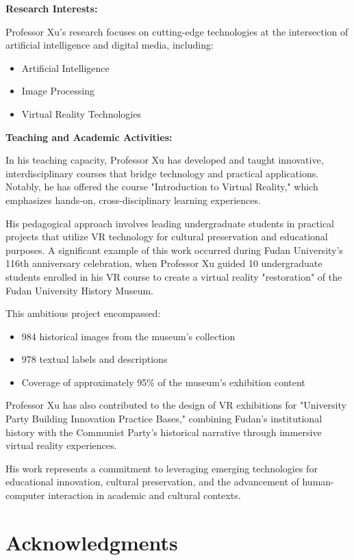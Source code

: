 \documentclass[11pt,letterpaper]{book}
\begin{document}
\textbf{Research Interests:}

Professor Xu's research focuses on cutting-edge technologies at the intersection of artificial intelligence and digital media, including:
\begin{itemize}
\item Artificial Intelligence
\item Image Processing
\item Virtual Reality Technologies
\end{itemize}

\textbf{Teaching and Academic Activities:}

In his teaching capacity, Professor Xu has developed and taught innovative, interdisciplinary courses that bridge technology and practical applications. Notably, he has offered the course "Introduction to Virtual Reality," which emphasizes hands-on, cross-disciplinary learning experiences.

His pedagogical approach involves leading undergraduate students in practical projects that utilize VR technology for cultural preservation and educational purposes. A significant example of this work occurred during Fudan University's 116th anniversary celebration, when Professor Xu guided 10 undergraduate students enrolled in his VR course to create a virtual reality "restoration" of the Fudan University History Museum.

This ambitious project encompassed:
\begin{itemize}
\item 984 historical images from the museum's collection
\item 978 textual labels and descriptions
\item Coverage of approximately 95\% of the museum's exhibition content
\end{itemize}

Professor Xu has also contributed to the design of VR exhibitions for "University Party Building Innovation Practice Bases," combining Fudan's institutional history with the Communist Party's historical narrative through immersive virtual reality experiences.

His work represents a commitment to leveraging emerging technologies for educational innovation, cultural preservation, and the advancement of human-computer interaction in academic and cultural contexts.

\chapter*{Acknowledgments}
\end{document}
